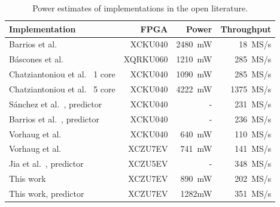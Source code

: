 \begin{table}[ht]
	\caption{Power estimates of implementations in the open literature.}
	\label{tab:power-this-work}
	\centering
	\begin{tabular}{lrrr}
		\hline
		\textbf{Implementation}                                                                                      & \textbf{FPGA} & \textbf{Power} & \textbf{Throughput} \\
		\hline
		Barrios et al.\ \cite{barriosHardwareImplementationCCSDS2021}                                                & XCKU040       & 2480~mW        & 18~MS/s             \\
		B\'ascones et al.\ \cite{basconesRealTimeFPGAImplementation2022}                                             & XQRKU060      & 1210~mW        & 285~MS/s            \\
		Chatziantoniou et al.\ \cite{chatziantoniouScalableDataRateNearLossless2022a} 1 core                         & XCKU040       & 1090~mW        & 285~MS/s            \\
		Chatziantoniou et al.\ \cite{chatziantoniouScalableDataRateNearLossless2022a} 5 core                         & XCKU040       & 4222~mW        & 1375~MS/s           \\
		S\'anchez et al.\ \cite{sanchezReducingDataDependencies2022, barriosRemovingDataDependencies2024}, predictor & XCKU040       & -              & 231~MS/s            \\
		Barrios et al.\ \cite{barriosRemovingDataDependencies2024}, predictor                                        & XCKU040       & -              & 236~MS/s            \\
		Vorhaug et al.\ \cite{vorhaugHyperspectralImageCompression2024}                                              & XCKU040       & 640~mW         & 110~MS/s            \\
		Vorhaug et al.\ \cite{vorhaugHyperspectralImageCompression2024}                                              & XCZU7EV       & 741~mW         & 141~MS/s            \\
		Jia et al.\ \cite{jiaRemovalFeedbackLoop2025}, predictor                                                     & XCZU5EV       & -              & 348~MS/s            \\
		This work                                                                                                    & XCZU7EV       & 890~mW         & 202~MS/s            \\
		This work, predictor                                                                                         & XCZU7EV       & 1282mW         & 351~MS/s            \\
		\hline
	\end{tabular}
\end{table}

